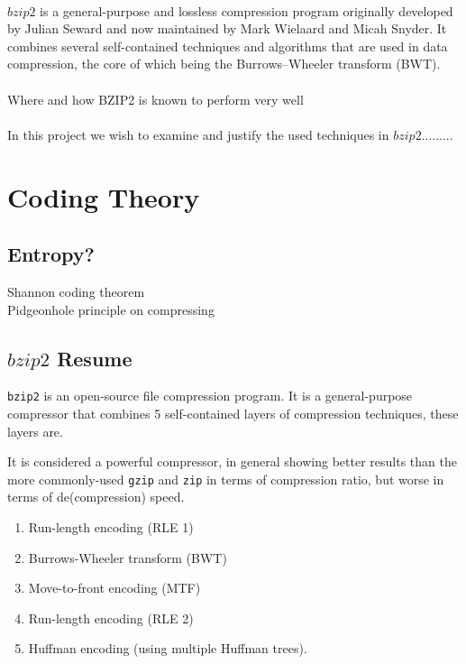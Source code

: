 \documentclass{article}
\begin{document}
\\
\(bzip2\) is a general-purpose and lossless compression program originally developed by Julian Seward and now maintained by Mark Wielaard and Micah Snyder. %
It combines several self-contained techniques and algorithms that are used in data compression, the core of which being the Burrows–Wheeler transform (BWT).
\\
\\
Where and how BZIP2 is known to perform very well
\\
\\
In this project we wish to examine and justify the used techniques in \(bzip2\).........

\section{Coding Theory}
% 
\subsection{Entropy?}
Shannon coding theorem \\
Pidgeonhole principle on compressing


\subsection{\(bzip2\) Resume}
\texttt{bzip2} is an open-source file compression program. It is a general-purpose compressor that combines 5 self-contained layers of compression techniques, these layers are. 

It is considered a powerful compressor, in general showing better results than the more commonly-used \texttt{gzip} and \texttt{zip} in terms of compression ratio, but worse in terms of de(compression) speed.

\begin{enumerate}
	\item Run-length encoding (RLE 1)
	\item Burrows-Wheeler transform (BWT)
	\item Move-to-front encoding (MTF)
	\item Run-length encoding (RLE 2)
	\item Huffman encoding (using multiple Huffman trees).
\end{enumerate}
\end{document}
